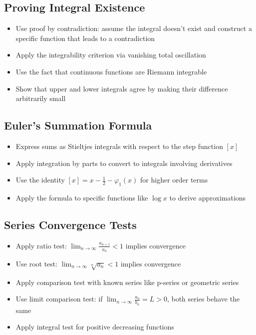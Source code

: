 \subsection*{Proving Integral Existence}
\begin{itemize}
\item Use proof by contradiction: assume the integral doesn't exist and construct a specific function that leads to a contradiction
\item Apply the integrability criterion via vanishing total oscillation
\item Use the fact that continuous functions are Riemann integrable
\item Show that upper and lower integrals agree by making their difference arbitrarily small
\end{itemize}

\subsection*{Euler's Summation Formula}
\begin{itemize}
\item Express sums as Stieltjes integrals with respect to the step function $[x]$
\item Apply integration by parts to convert to integrals involving derivatives
\item Use the identity $[x] = x - \frac{1}{2} - \varphi_1(x)$ for higher order terms
\item Apply the formula to specific functions like $\log x$ to derive approximations
\end{itemize}

\subsection*{Series Convergence Tests}
\begin{itemize}
\item Apply ratio test: $\lim_{n\to\infty} \frac{a_{n+1}}{a_n} < 1$ implies convergence
\item Use root test: $\lim_{n\to\infty} \sqrt[n]{a_n} < 1$ implies convergence
\item Apply comparison test with known series like p-series or geometric series
\item Use limit comparison test: if $\lim_{n\to\infty} \frac{a_n}{b_n} = L > 0$, both series behave the same
\item Apply integral test for positive decreasing functions
\end{itemize}

